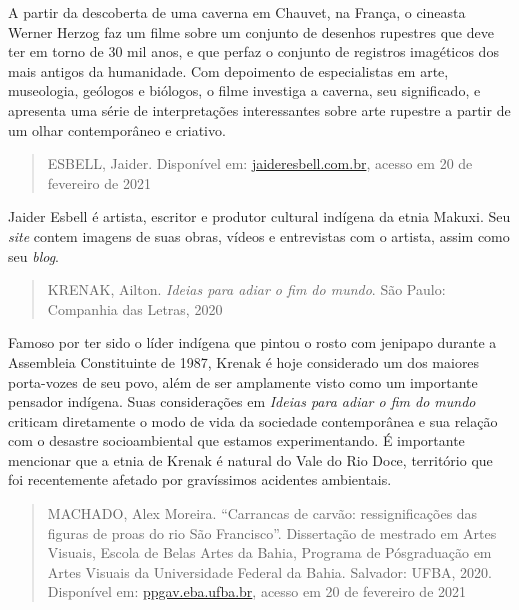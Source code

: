 \documentclass[12pt]{extarticle}
\begin{document}
    A partir da descoberta de uma caverna em Chauvet, na França, o
    cineasta Werner Herzog faz um filme sobre um conjunto de desenhos
    rupestres que deve ter em torno de 30 mil anos, e que perfaz o
    conjunto de registros imagéticos dos mais antigos da humanidade. Com
    depoimento de especialistas em arte, museologia, geólogos e
    biólogos, o filme investiga a caverna, seu significado, e apresenta
    uma série de interpretações interessantes sobre arte rupestre a
    partir de um olhar contemporâneo e criativo.

    \begin{quote}
    ESBELL, Jaider. Disponível em:
    \href{http://www.jaideresbell.com.br/site/}{jaideresbell.com.br},
    acesso em 20 de fevereiro de 2021
    \end{quote}

    Jaider Esbell é artista, escritor e produtor cultural indígena da
    etnia Makuxi. Seu \emph{site} contem imagens de suas obras, vídeos e
    entrevistas com o artista, assim como seu \emph{blog}.

    \begin{quote}
    KRENAK, Ailton. \emph{Ideias para adiar o fim do mundo}. São Paulo:
    Companhia das Letras, 2020
    \end{quote}

    Famoso por ter sido o líder indígena que pintou o rosto com jenipapo
    durante a Assembleia Constituinte de 1987, Krenak é hoje considerado
    um dos maiores porta-vozes de seu povo, além de ser amplamente visto
    como um importante pensador indígena. Suas considerações em
    \emph{Ideias para adiar o fim do mundo} criticam diretamente o modo
    de vida da sociedade contemporânea e sua relação com o desastre
    socioambiental que estamos experimentando. É importante mencionar
    que a etnia de Krenak é natural do Vale do Rio Doce, território que
    foi recentemente afetado por gravíssimos acidentes ambientais.

    \begin{quote}
    MACHADO, Alex Moreira. ``Carrancas de carvão: ressignificações das
    figuras de proas do rio São Francisco''. Dissertação de mestrado em
    Artes Visuais, Escola de Belas Artes da Bahia, Programa de
    Pósgraduação em Artes Visuais da Universidade Federal da Bahia.
    Salvador: UFBA, 2020. Disponível em:
    \href{http://www.ppgav.eba.ufba.br/sites/ppgav.eba.ufba.br/files/2020_-_alex_moreira_machado.pdf}{ppgav.eba.ufba.br},
    acesso em 20 de fevereiro de 2021
    \end{quote}
\end{document}
